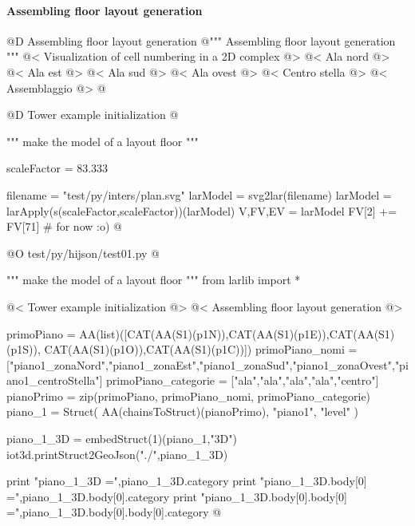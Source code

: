\documentclass[11pt,oneside]{article}    %
\begin{document}
\paragraph{Assembling floor layout generation}
@D Assembling floor layout generation
@{""" Assembling floor layout generation """
@< Visualization of cell numbering in a 2D complex @>
@< Ala nord @>
@< Ala est @>
@< Ala sud @>
@< Ala ovest @>
@< Centro stella @>
@< Assemblaggio @>
@}



@D Tower example initialization
@{""" make the model of a layout floor """

scaleFactor = 83.333

filename = "test/py/inters/plan.svg"
larModel = svg2lar(filename)
larModel = larApply(s(scaleFactor,scaleFactor))(larModel)
V,FV,EV = larModel
FV[2] += FV[71]      # for now :o)
@}


@O test/py/hijson/test01.py
@{""" make the model of a layout floor """
from larlib import *

@< Tower example initialization @>
@< Assembling floor layout generation @>

primoPiano = AA(list)([CAT(AA(S1)(p1N)),CAT(AA(S1)(p1E)),CAT(AA(S1)(p1S)), 
                CAT(AA(S1)(p1O)),CAT(AA(S1)(p1C))])
primoPiano_nomi = ["piano1_zonaNord","piano1_zonaEst","piano1_zonaSud","piano1_zonaOvest","piano1_centroStella"]
primoPiano_categorie = ["ala","ala","ala","ala","centro"]
pianoPrimo = zip(primoPiano, primoPiano_nomi, primoPiano_categorie)
piano_1 = Struct( AA(chainsToStruct)(pianoPrimo), "piano1", "level" )

piano_1_3D = embedStruct(1)(piano_1,"3D")
iot3d.printStruct2GeoJson("./",piano_1_3D)

print "piano_1_3D =",piano_1_3D.category
print "piano_1_3D.body[0] =",piano_1_3D.body[0].category
print "piano_1_3D.body[0].body[0] =",piano_1_3D.body[0].body[0].category
@}
\end{document}
